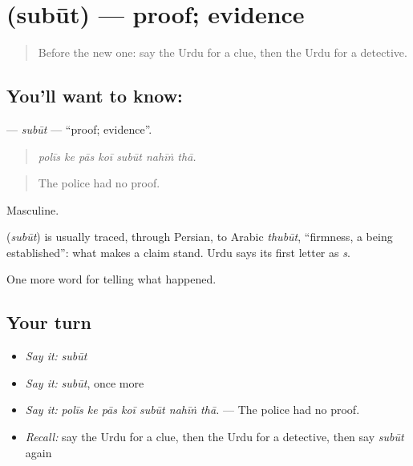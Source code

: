 \section[\texorpdfstring{\ur{ثبوت} (subūt)}{ثبوت (subūt)}]{ (subūt) — proof; evidence}

\label{lesson:UR-C282-subut}



\begin{quote}
Before the new one: say the Urdu for a clue, then the Urdu for a detective.
\end{quote}

\subsection*{You'll want to know: }
\textbf{} — \emph{subūt} — \textquotedblleft{}proof; evidence\textquotedblright{}.

\begin{quote}
      
\end{quote}

\begin{quote}
\emph{polīs ke pās koī subūt nahīṅ thā.}
\end{quote}

\begin{quote}
The police had no proof.
\end{quote}

Masculine.

\begin{cousinweb}
\textbf{} (\emph{subūt}) is usually traced, through Persian, to Arabic \emph{thubūt}, \textquotedblleft{}firmness, a being established\textquotedblright{}: what makes a claim stand. Urdu says its first letter as \emph{s}.
\end{cousinweb}

\begin{grammarlens}[title={What you've built}]
One more word for telling what happened.
\end{grammarlens}

\subsection*{Your turn}
\begin{itemize}
\raggedright
  \item \emph{Say it:} \emph{subūt}
  \item \emph{Say it:} \emph{subūt}, once more
  \item \emph{Say it:} \emph{polīs ke pās koī subūt nahīṅ thā.} — The police had no proof.
  \item \emph{Recall:} say the Urdu for a clue, then the Urdu for a detective, then say \emph{subūt} again
\end{itemize}

